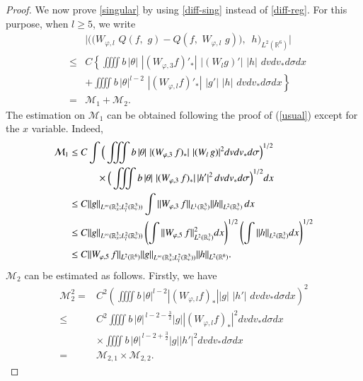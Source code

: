 \documentclass{amsart}[12pt, article]
\begin{document}
\begin{proof}
\smallbreak
We now prove \eqref{singular} by using \eqref{diff-sing}
instead of \eqref{diff-reg}. For this purpose,
when $l\ge 5$, we write
\begin{eqnarray*}
&&\Big|\Big(\big(W_{\varphi,l}\,\,Q(f,\,\,g)-Q(f,\,\,W_{\varphi,l}\,\, g)\big),\,\,\,
h\Big)_{L^2({{{\mathbb R}}}^6)}\Big| \\
& \leq& C \left \{ \iiiint  b\, |\theta|\,\,
|(W_{\varphi,3} f)'_*|\,\,|(W_{l}g)'|\,\,|h|\,\,dvdv_*d\sigma dx
\right.\\
&&\left . + \iiiint  b\, |\theta|^{l-2}\,\,
|(W_{\varphi,l} f)'_*|\,\,|g'|\,\,|h|\,\,dvdv_*d\sigma dx \right \}\\
& =&{{\mathcal M}}_1 + {{\mathcal M}}_2 .
\end{eqnarray*}
The estimation on  ${{\mathcal M}}_1$ can be obtained following the proof of  (\ref{usual}) except for the $x$ variable.
Indeed,
\begin{align*}
{{\mathcal M}}_1
&\leq C \int \Big(\iiint  b\, |\theta|\,\, |(W_{\varphi,3}\,
 f)_*|\,\,|(W_{l}\, g)|^2 dv dv_*
d\sigma \Big)^{1/2}\\
&\hskip1cm \times \Big(\iiint  b\, |\theta|\,\, |(W_{\varphi,3}\, f)_*|\,
|h'|^2\, dvdv_*d\sigma \Big)^{1/2} dx\\
&\leq C \|g\|_{L^\infty({{{\mathbb R}}}^3_x; L^2_{l}({{{\mathbb R}}}^3_v))} \int
\|W_{\varphi,3}\,f\|_{L^1({{{\mathbb R}}}_v^3)}\|h\|_{L^2({{{\mathbb R}}}_v^3)}\,dx\\
&\leq C\|g\|_{L^\infty({{{\mathbb R}}}^3_x; L^2_{l}({{{\mathbb R}}}^3_v))} \left(\int
\|W_{\varphi,5}\,f\|_{L^2({{{\mathbb R}}}_v^3)}^2 dx
\right)^{1/2}\left(\int\|h\|_{L^2({{{\mathbb R}}}^3_v)}dx
\right)^{1/2}\\
&\leq C\|W_{\varphi,5}\,f\|_{L^2({{{\mathbb R}}}^6)}\|g\|_{L^\infty({{{\mathbb R}}}^3_x; L^2_{l}({{{\mathbb R}}}^3_v))}
\|h\|_{L^2({{{\mathbb R}}}^6)}.
\end{align*}
 ${{\mathcal M}}_2$ can be estimated as follows. Firstly, we have
\begin{align*}
{{\mathcal M}}_2^2 =& C^2  \left(\iiiint  b\, |\theta|^{l-2}
|(W_{\varphi,l} f)_*||g|\,\,|h'|\,\,dvdv_*d\sigma dx \right)^2  \\
 \le &C^2  \iiiint b \, |\theta|^{\, l-2-\frac{3}{2}}
 |g||(W_{\varphi,l} f)_*|^2 dv dv_* d\sigma dx \\
& \times \iiiint b \, |\theta|^{\,l-2+\frac{3}{2}}|g||h'|^2 dv dv_* d \sigma dx\\
= & {{\mathcal M}}_{2,1} \times {{\mathcal M}}_{2,2}.
\end{align*}

\end{proof}
\end{document}
